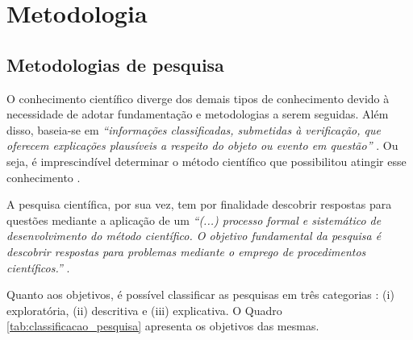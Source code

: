 \chapter[Metodologia]{Metodologia}



\section{Metodologias de pesquisa}

O conhecimento científico diverge dos demais tipos de conhecimento devido à necessidade de adotar fundamentação e metodologias a serem seguidas. Além disso, baseia-se em \textit{“informações classificadas, submetidas à verificação, que oferecem explicações plausíveis a respeito do objeto ou evento em questão”} \cite[pág. 22]{prodanov2013}. Ou seja, é imprescindível determinar o método científico que possibilitou atingir esse conhecimento \cite[pág. 24]{prodanov2013}. 

A pesquisa científica, por sua vez, tem por finalidade descobrir respostas para questões mediante a aplicação de um \textit{“(...) processo formal e sistemático de desenvolvimento do método científico. O objetivo fundamental da pesquisa é descobrir respostas para problemas mediante o emprego de procedimentos científicos.”}  \cite[pág. 26]{gil2008}.

Quanto aos objetivos, é possível classificar as pesquisas em
três categorias \cite[pág. 41]{gil2002}: (i) exploratória, (ii) descritiva e (iii) explicativa. O Quadro \ref{tab:classificacao_pesquisa} apresenta os objetivos das mesmas.

